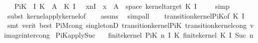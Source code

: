 \begin{isabellebody}
\ \ \ {\isachardoublequoteopen}PiK\ {}\ I\ K\ {\isasymomega}\ A{\isacharprime}{\kern0pt}\ {\isacharequal}{\kern0pt}\ {\isacharparenleft}{\kern0pt}K\ {\isacharparenleft}{\kern0pt}I\ {}{\isacharparenright}{\kern0pt}{\isacharparenright}{\kern0pt}\ {\isasymomega}\ {\isacharparenleft}{\kern0pt}{\isacharparenleft}{\kern0pt}{\isasymlambda}x{\isachardot}{\kern0pt}{\isacharparenleft}{\kern0pt}{\isasymlambda}n{\isasymin}{\isacharbraceleft}{\kern0pt}I\ {}{\isacharbraceright}{\kern0pt}{\isachardot}{\kern0pt}\ x{\isacharparenright}{\kern0pt}{\isacharparenright}{\kern0pt}\ {\isacharminus}{\kern0pt}{\isacharbackquote}{\kern0pt}\ A{\isacharprime}{\kern0pt}\ {\isasyminter}\ space\ {\isacharparenleft}{\kern0pt}kernel{\isacharunderscore}{\kern0pt}target\ {\isacharparenleft}{\kern0pt}K\ {\isacharparenleft}{\kern0pt}I\ {}{\isacharparenright}{\kern0pt}{\isacharparenright}{\kern0pt}{\isacharparenright}{\kern0pt}{\isacharparenright}{\kern0pt}{\isachardoublequoteclose}\isanewline
%
\isadelimproof
\ \ %
\endisadelimproof
%
\isatagproof
{}\isamarkupfalse%
\ simp\isanewline
\ \ \isamarkupfalse%
\ {\isacharparenleft}{\kern0pt}subst\ kernel{\isacharunderscore}{\kern0pt}apply{\isacharunderscore}{\kern0pt}kernel{\isacharunderscore}{\kern0pt}of{\isacharparenright}{\kern0pt}\isanewline
\ \ \isamarkupfalse%
\ assms\ \isamarkupfalse%
\ simp{\isacharunderscore}{\kern0pt}all\isanewline
\ \ \isamarkupfalse%
\ transition{\isacharunderscore}{\kern0pt}kernel{\isacharunderscore}{\kern0pt}PiK{\isacharunderscore}{\kern0pt}{}{\isacharbrackleft}{\kern0pt}of\ K\ I{\isacharbrackright}{\kern0pt}\isanewline
\ \ \isamarkupfalse%
\ {\isacharparenleft}{\kern0pt}smt\ {\isacharparenleft}{\kern0pt}verit{\isacharcomma}{\kern0pt}\ best{\isacharparenright}{\kern0pt}\ PiM{\isacharunderscore}{\kern0pt}cong\ singletonD\ transition{\isacharunderscore}{\kern0pt}kernel{\isacharunderscore}{\kern0pt}PiK{\isacharunderscore}{\kern0pt}{}\ transition{\isacharunderscore}{\kern0pt}kernel{\isacharunderscore}{\kern0pt}cong\ vimage{\isacharunderscore}{\kern0pt}inter{\isacharunderscore}{\kern0pt}cong{\isacharparenright}{\kern0pt}%
\endisatagproof
{\isafoldproof}%
%
\isadelimproof
\isanewline
%
\endisadelimproof
\isanewline
{}\isamarkupfalse%
\ PiK{\isacharunderscore}{\kern0pt}apply{\isacharunderscore}{\kern0pt}Suc{\isacharcolon}{\kern0pt}\isanewline
\ \ \ {\isachardoublequoteopen}finite{\isacharunderscore}{\kern0pt}kernel\ {\isacharparenleft}{\kern0pt}PiK\ n\ I\ K{\isacharparenright}{\kern0pt}{\isachardoublequoteclose}\ {\isachardoublequoteopen}finite{\isacharunderscore}{\kern0pt}kernel\ {\isacharparenleft}{\kern0pt}K\ {\isacharparenleft}{\kern0pt}I\ {\isacharparenleft}{\kern0pt}Suc\ n{\isacharparenright}{\kern0pt}{\isacharparenright}{\kern0pt}{\isacharparenright}{\kern0pt}{\isachardoublequoteclose}\isanewline

\end{isabellebody}
